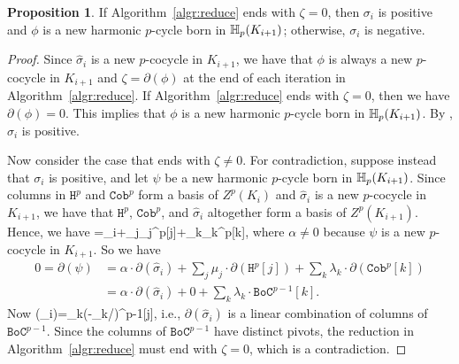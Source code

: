 \documentclass[10pt,a4paper]{amsart}
\newcommand {\mm}[1] {\ifmmode{#1}\else{\mbox{\(#1\)}}\fi}
\newcommand{\har}           {\mm{\mathbb{H}}}
\theoremstyle{definition}
\newcommand{\red}{\color{red}}
\newcommand{\fsimp}{\sigma}
\newcommand{\Zyc}{Z}
\newcommand{\Cobmat}{\mathtt{Cob}}
\newcommand{\Bndmat}{\mathtt{BoC}}
\newcommand{\Harmat}{\mathtt{H}}
\newcommand{\aG}{\alpha}
\newcommand{\sG}{\sigma}
\newcommand{\lG}{\lambda}
\newcommand{\zG}{\zeta}
\newtheorem{proposition}[theorem]{Proposition}
\theoremstyle{remark}
\begin{document}
\begin{proposition}
\label{prop:reduce}
If 
Algorithm~\ref{algr:reduce} ends with $\zG=0$,
then $\fsimp_i$ is positive
and $\phi$ is a new harmonic $p$-cycle born in $\har_p(K_{i+1})$;
otherwise, $\fsimp_i$ is negative.
\end{proposition}
\begin{proof}

Since $\hat{\fsimp}_i$ is a new $p$-cocycle in $K_{i+1}$,
we have that $\phi$ is always a new $p$-cocycle in $K_{i+1}$
and  $\zG=\partial(\phi)$ at the end of each iteration in Algorithm~\ref{algr:reduce}.
If Algorithm~\ref{algr:reduce}
ends with $\zG=0$, then 
we have $\partial(\phi)=0$.
This implies that $\phi$ is a new harmonic $p$-cycle born in $\har_p(K_{i+1})$.
By ,
$\fsimp_i$ is positive.

Now consider the case that  ends with $\zG\neq 0$.
For  contradiction, suppose instead that $\fsimp_i$ is positive,
and let $\psi$ be a new harmonic $p$-cycle born in $\har_p(K_{i+1})$.
Since columns in $\Harmat^p$ and $\Cobmat^p$ form a basis of $\Zyc^p(K_i)$
and $\hat{\fsimp}_i$ is a new $p$-cocycle in $K_{i+1}$,
we have that $\Harmat^p$, $\Cobmat^p$, and $\hat{\fsimp}_i$ altogether form a basis of $\Zyc^p(K_{i+1})$.
Hence, 
we have
\mbeg\psi=\aG\cdot\hat{\fsimp}_i+\sum_j\mu_j\cdot\Harmat^p[j]+\sum_k\lG_k\cdot\Cobmat^p[k],\mend
where $\aG\neq 0$ because 
$\psi$ is a new  $p$-cocycle in $K_{i+1}$.
So we have \begin{align*}
0=\partial(\psi)&=\aG\cdot\partial(\hat{\fsimp}_i)+\sum_j\mu_j\cdot\partial(\Harmat^p[j])+\sum_k\lG_k\cdot\partial(\Cobmat^p[k])\\
&=\aG\cdot\partial(\hat{\fsimp}_i)+0+\sum_k\lG_k\cdot\Bndmat^{p-1}[k].
\end{align*}
Now \mbeg\partial(\hat{\fsimp}_i)=\sum_k(-\lG_k/\aG)\cdot\Bndmat^{p-1}[j],\mend
i.e., $\partial(\hat{\fsimp}_i)$ is a linear combination of
columns of $\Bndmat^{p-1}$.
Since the columns of $\Bndmat^{p-1}$ have distinct pivots,
the reduction in Algorithm~\ref{algr:reduce} must end with $\zG=0$,
which is a contradiction.
\end{proof}
\end{document}
